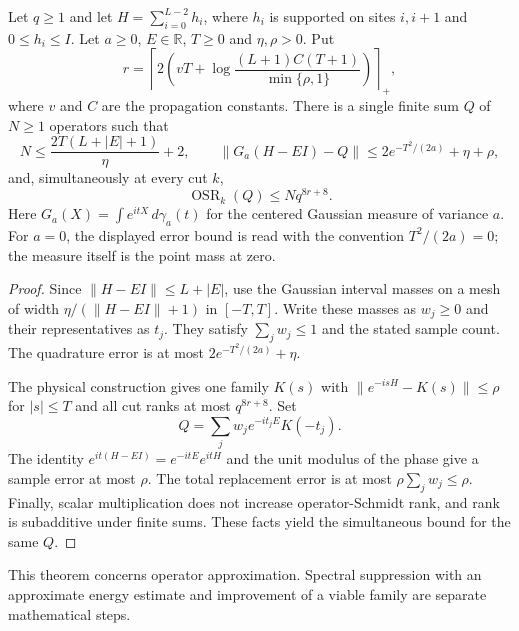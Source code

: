 \begin{lemma}
    \label{thm:huang_physical_gaussian}
    \leanok
    Let $q\ge1$ and let $H=\sum_{i=0}^{L-2}h_i$, where $h_i$ is supported on
    sites $i,i+1$ and $0\le h_i\le I$. Let $a\ge0$, $E\in\mathbb R$, $T\ge0$
    and $\eta,\rho>0$. Put
    \[
        r=\left\lceil2\left(vT+
        \log\frac{(L+1)C(T+1)}{\min\{\rho,1\}}\right)\right\rceil_+,
    \]
    where $v$ and $C$ are the propagation constants. There is a single finite sum
    $Q$ of $N\ge1$ operators such that
    \[
        N\le\frac{2T(L+|E|+1)}{\eta}+2,\qquad
        \|G_a(H-EI)-Q\|
        \le2e^{-T^2/(2a)}+\eta+\rho,
    \]
    and, simultaneously at every cut $k$,
    \[
        \operatorname{OSR}_k(Q)\le Nq^{8r+8}.
    \]
    Here $G_a(X)=\int e^{itX}\,d\gamma_a(t)$ for the centered Gaussian
    measure of variance $a$. For $a=0$, the displayed error bound is read with
    the convention $T^2/(2a)=0$; the measure itself is the point mass at zero.
\end{lemma}
\begin{proof}
    \leanok
    Since $\|H-EI\|\le L+|E|$, use the Gaussian interval masses on a mesh
    of width $\eta/(\|H-EI\|+1)$ in $[-T,T]$. Write these masses as
    $w_j\ge0$ and their representatives as $t_j$. They satisfy
    $\sum_jw_j\le1$ and the stated sample count. The quadrature error is
    at most $2e^{-T^2/(2a)}+\eta$.

    The physical construction gives one family $K(s)$ with
    $\|e^{-isH}-K(s)\|\le\rho$ for $|s|\le T$ and all cut ranks at most
    $q^{8r+8}$. Set
    \[
        Q=\sum_j w_j e^{-it_jE}K(-t_j).
    \]
    The identity $e^{it(H-EI)}=e^{-itE}e^{itH}$ and the unit modulus of the
    phase give a sample error at most $\rho$. The total replacement error
    is at most $\rho\sum_jw_j\le\rho$. Finally, scalar multiplication does
    not increase operator-Schmidt rank, and rank is subadditive under finite
    sums. These facts yield the simultaneous bound for the same $Q$.
\end{proof}

This theorem concerns operator approximation. Spectral suppression with an
approximate energy estimate and improvement of a viable family are separate
mathematical steps.
